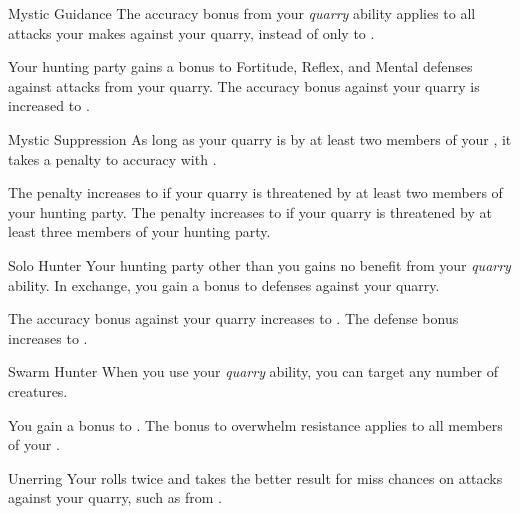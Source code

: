 {            \begin{ability}{Mystic Guidance}
                The accuracy bonus from your \textit{quarry} ability applies to all attacks your  makes against your quarry, instead of only to .

                \rankline
                 Your hunting party gains a  bonus to Fortitude, Reflex, and Mental defenses against attacks from your quarry.
                 The accuracy bonus against your quarry is increased to .
            \end{ability}

            \begin{ability}{Mystic Suppression}
                As long as your quarry is  by at least two members of your , it takes a  penalty to accuracy with .

                \rankline
                 The penalty increases to  if your quarry is threatened by at least two members of your hunting party.
                 The penalty increases to  if your quarry is threatened by at least three members of your hunting party.
            \end{ability}

            \begin{ability}{Solo Hunter}
                Your hunting party other than you gains no benefit from your \textit{quarry} ability.
                In exchange, you gain a  bonus to defenses against your quarry.

                \rankline
                 The accuracy bonus against your quarry increases to .
                 The defense bonus increases to .
            \end{ability}

            \begin{ability}{Swarm Hunter}
                When you use your \textit{quarry} ability, you can target any number of creatures.

                \rankline
                 You gain a  bonus to .
                 The bonus to overwhelm resistance applies to all members of your .
            \end{ability}

            \begin{ability}{Unerring}
                Your  rolls twice and takes the better result for miss chances on attacks against your quarry, such as from .


\end{ability}}
